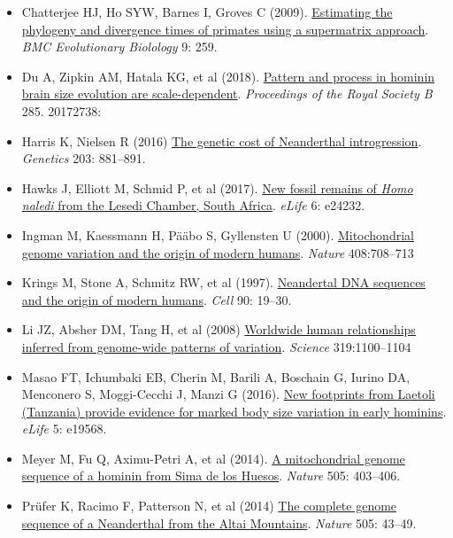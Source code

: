 \documentclass[
]{book}
\begin{document}
\begin{itemize}
\item
  Chatterjee HJ, Ho SYW, Barnes I, Groves C (2009). \href{https://bmcecolevol.biomedcentral.com/articles/10.1186/1471-2148-9-259}{Estimating the phylogeny and divergence times of primates using a supermatrix approach}. \emph{BMC Evolutionary Biolology} 9: 259.
\item
  Du A, Zipkin AM, Hatala KG, et al (2018). \href{https://doi.org/10.1098/rspb.2017.2738}{Pattern and process in hominin brain size evolution are scale-dependent}. \emph{Proceedings of the Royal Society B} 285. 20172738:
\item
  Harris K, Nielsen R (2016) \href{https://www.genetics.org/content/203/2/881}{The genetic cost of Neanderthal introgression}. \emph{Genetics} 203: 881--891.
\item
  Hawks J, Elliott M, Schmid P, et al (2017). \href{https://doi.org/10.7554/eLife.24232}{New fossil remains of \emph{Homo naledi} from the Lesedi Chamber, South Africa}. \emph{eLife} 6: e24232.
\item
  Ingman M, Kaessmann H, Pääbo S, Gyllensten U (2000). \href{https://www.nature.com/articles/35047064}{Mitochondrial genome variation and the origin of modern humans}. \emph{Nature} 408:708--713
\item
  Krings M, Stone A, Schmitz RW, et al (1997). \href{https://www.cell.com/fulltext/S0092-8674(00)80310-4}{Neandertal DNA sequences and the origin of modern humans}. \emph{Cell} 90: 19--30.
\item
  Li JZ, Absher DM, Tang H, et al (2008) \href{https://www.science.org/doi/10.1126/science.1153717}{Worldwide human relationships inferred from genome-wide patterns of variation}. \emph{Science} 319:1100--1104
\item
  Masao FT, Ichumbaki EB, Cherin M, Barili A, Boschain G, Iurino DA, Menconero S, Moggi-Cecchi J, Manzi G (2016). \href{https://doi.org/10.7554/eLife.19568}{New footprints from Laetoli (Tanzania) provide evidence for marked body size variation in early hominins}. \emph{eLife} 5: e19568.
\item
  Meyer M, Fu Q, Aximu-Petri A, et al (2014). \href{https://www.nature.com/articles/nature12788}{A mitochondrial genome sequence of a hominin from Sima de los Huesos}. \emph{Nature} 505: 403--406.
\item
  Prüfer K, Racimo F, Patterson N, et al (2014) \href{https://www.nature.com/articles/nature12886}{The complete genome sequence of a Neanderthal from the Altai Mountains}. \emph{Nature} 505: 43--49.

\end{itemize}
\end{document}
